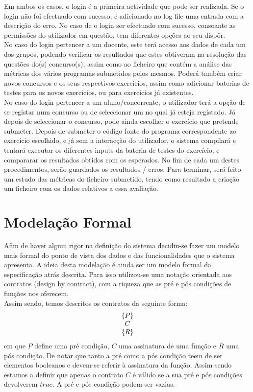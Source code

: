 Em ambos os casos, o login é a primeira actividade que pode ser realizada.
Se o login não foi efectuado com sucesso, é adicionado no log file uma entrada com a descrição do erro.
No caso de o login ser efectuado com sucesso, consoante as permissões do utilizador em questão, tem diferentes opções ao seu dispôr.\\

No caso do login pertencer a um docente, este terá acesso aos dados de cada um dos grupos, podendo verificar os resultados que estes 
obtiveram na resolução das questões do(s) concurso(s), assim como ao ficheiro que contém a análise das métricas dos vários programas submetidos 
pelos mesmos.
Poderá também criar novos concursos e os seus respectivos exercícios, assim como adicionar baterias de testes para os novos exercícios, 
ou para exercícios já existentes.\\

No caso do login pertencer a um aluno/concorrente, o utilizador terá a opção de se registar num concurso ou de seleccionar um no qual já 
esteja registado.
Já depois de seleccionar o concurso, pode ainda escolher o exercício que pretende submeter.
Depois de submeter o código fonte do programa correspondente ao exercício escolhido, e já sem a interacção do utilizador, 
o sistema compilará e tentará executar os diferentes inputs da bateria de testes do exercício, e compararar os resultados obtidos com os esperados.
No fim de cada um destes procedimentos, serão guardados os resultados / erros.
Para terminar, será feito um estudo das métricas do ficheiro submetido, tendo como resultado a criação um ficheiro com os dados relativos a essa avaliação.\\

\section{Modelação Formal}\label{sec modfor}

Afim de haver algum rigor na definição do sistema decidiu-se fazer um modelo mais formal do ponto de vista dos dados e das funcionalidades que o sistema apresenta.
A ideia desta modelação é ainda ser um modelo formal da especificação atrás descrita. Para isso utilizou-se uma notação orientada aos contratos (design by contract),
com a riqueza que as pré e pós condições de funções nos oferecem.\\

Assim sendo, temos descritos os contratos da seguinte forma:
$$\noindent\begin{array}{c} \{P\} \\ C \\ \{R\} \\ \end{array}$$
em que $P$ define uma pré condição, $C$ uma assinatura de uma função e $R$ uma pós condição.
De notar que tanto a pré como a pós condição teem de ser elementos booleanos e devem-se referir à assinatura da função. Assim sendo estamos a definir que apenas o contrato $C$
é válido se a sua pré e pós condições devolverem $true$. A pré e pós condição podem ser vazias.\\

